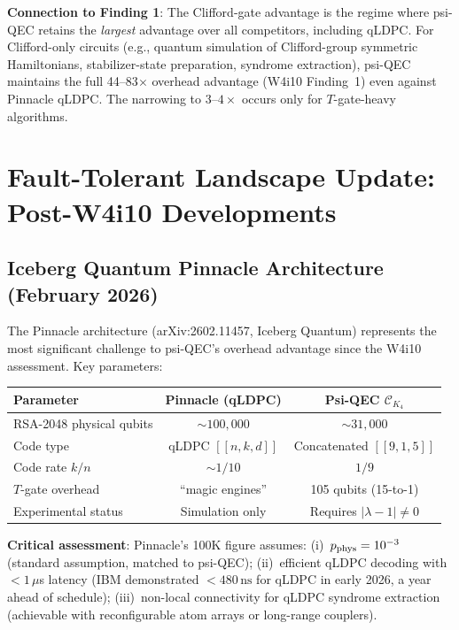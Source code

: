\documentclass[11pt]{article}
\theoremstyle{definition}
\theoremstyle{remark}
\newcommand{\CK}{\mathcal{C}_K}
\newcommand{\lamdiff}{|\lambda-1|}
\begin{document}
\begin{tcolorbox}[colback=blue!5!white, colframe=blue!60!black,
  title=\textbf{W4i13 TOP 5 FINDINGS --- READ FIRST}]
\begin{enumerate}[nosep]
  \textbf{Connection to Finding 1}: The Clifford-gate advantage is the
  regime where psi-QEC retains the \emph{largest} advantage over all
  competitors, including qLDPC.  For Clifford-only circuits (e.g.,
  quantum simulation of Clifford-group symmetric Hamiltonians,
  stabilizer-state preparation, syndrome extraction), psi-QEC maintains
  the full 44--83$\times$ overhead advantage (W4i10 Finding~1) even
  against Pinnacle qLDPC.  The narrowing to $3$--$4\times$ occurs only
  for $T$-gate-heavy algorithms.

\end{enumerate}
\end{tcolorbox}

\section{Fault-Tolerant Landscape Update: Post-W4i10 Developments}
\label{sec:ft-landscape}

\subsection{Iceberg Quantum Pinnacle Architecture (February 2026)}
\label{sec:pinnacle}

The Pinnacle architecture (arXiv:2602.11457, Iceberg Quantum) represents
the most significant challenge to psi-QEC's overhead advantage since the
W4i10 assessment.  Key parameters:

\begin{center}
\begin{tabular}{@{}lcc@{}}
\toprule
Parameter & Pinnacle (qLDPC) & Psi-QEC $\CK_4$ \\
\midrule
RSA-2048 physical qubits & $\sim 100{,}000$ & $\sim 31{,}000$ \\
Code type & qLDPC $[[n,k,d]]$ & Concatenated $[[9,1,5]]$ \\
Code rate $k/n$ & $\sim 1/10$ & $1/9$ \\
$T$-gate overhead & ``magic engines'' & 105 qubits (15-to-1) \\
Experimental status & Simulation only & Requires $\lamdiff \neq 0$ \\
\bottomrule
\end{tabular}
\end{center}

\textbf{Critical assessment}: Pinnacle's 100K figure assumes:
(i)~$p_{\rm phys} = 10^{-3}$ (standard assumption, matched to psi-QEC);
(ii)~efficient qLDPC decoding with $< 1\,\mu$s latency (IBM demonstrated
$< 480\,\text{ns}$ for qLDPC in early 2026, a year ahead of schedule);
(iii)~non-local connectivity for qLDPC syndrome extraction (achievable
with reconfigurable atom arrays or long-range couplers).
\end{document}
